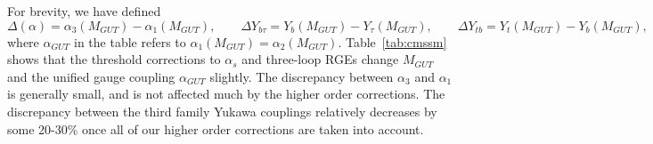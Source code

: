 \documentclass[final,3p,times,pdflatex]{elsarticle}
\begin{document}
For brevity, we have defined 
\begin{equation}
\Delta
(\alpha)=\alpha_3(M_{GUT})-\alpha_1(M_{GUT}),\qquad
\Delta Y_{b\tau}=Y_b(M_{GUT})-Y_\tau(M_{GUT}),\qquad
\Delta Y_{tb}=Y_t(M_{GUT})-Y_b(M_{GUT}),
\end{equation}
where $\alpha_{GUT}$ in the table refers to
$\alpha_1(M_{GUT})=\alpha_2(M_{GUT})$. 
Table~\ref{tab:cmssm} shows that the threshold corrections to $\alpha_s$ and
three-loop RGEs change $M_{GUT}$ and the unified gauge coupling $\alpha_{GUT}$
slightly. The discrepancy between $\alpha_{3}$ and $\alpha_1$ is generally
small, and is not affected much by the higher order corrections. The discrepancy
between the third family Yukawa couplings relatively decreases by some
20-30$\%$ once all of 
our higher order corrections are taken into account. 
\end{document}
